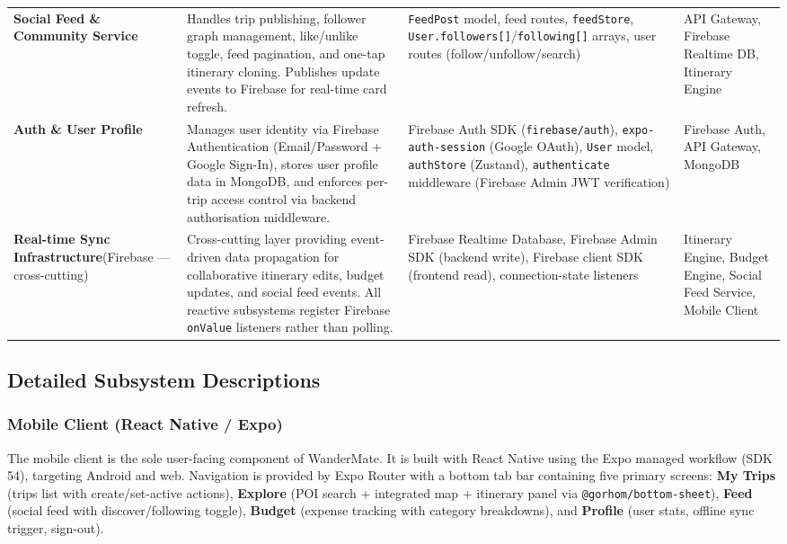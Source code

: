 \documentclass[12pt, a4paper]{article}
\begin{document}
\begin{longtable}{L{3.0cm} L{4.8cm} L{3.8cm} L{2.2cm}}
\textbf{Social Feed \& Community Service} &
Handles trip publishing, follower graph management, like/unlike toggle, feed pagination, and one-tap itinerary cloning. Publishes update events to Firebase for real-time card refresh. &
\texttt{FeedPost} model, feed routes, \texttt{feedStore}, \texttt{User.followers[]}/\texttt{following[]} arrays, user routes (follow/unfollow/search) &
API Gateway, Firebase Realtime DB, Itinerary Engine \\

\textbf{Auth \& User Profile} &
Manages user identity via Firebase Authentication (Email/Password + Google Sign-In), stores user profile data in MongoDB, and enforces per-trip access control via backend authorisation middleware. &
Firebase Auth SDK (\texttt{firebase/auth}), \texttt{expo-auth-session} (Google OAuth), \texttt{User} model, \texttt{authStore} (Zustand), \texttt{authenticate} middleware (Firebase Admin JWT verification) &
Firebase Auth, API Gateway, MongoDB \\

\textbf{Real-time Sync Infrastructure}\newline(Firebase --- cross-cutting) &
Cross-cutting layer providing event-driven data propagation for collaborative itinerary edits, budget updates, and social feed events. All reactive subsystems register Firebase \texttt{onValue} listeners rather than polling. &
Firebase Realtime Database, Firebase Admin SDK (backend write), Firebase client SDK (frontend read), connection-state listeners &
Itinerary Engine, Budget Engine, Social Feed Service, Mobile Client \\

\end{longtable}

\subsection{Detailed Subsystem Descriptions}

\subsubsection{Mobile Client (React Native / Expo)}

The mobile client is the sole user-facing component of WanderMate. It is built with React Native using the Expo managed workflow (SDK 54), targeting Android and web. Navigation is provided by Expo Router with a bottom tab bar containing five primary screens: \textbf{My Trips} (trips list with create/set-active actions), \textbf{Explore} (POI search + integrated map + itinerary panel via \texttt{@gorhom/bottom-sheet}), \textbf{Feed} (social feed with discover/following toggle), \textbf{Budget} (expense tracking with category breakdowns), and \textbf{Profile} (user stats, offline sync trigger, sign-out).
\end{document}
